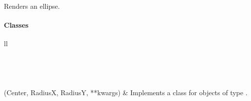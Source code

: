 \documentclass[letterpaper,10pt,english]{sphinxmanual}
\begin{document}
Renders an ellipse.


\paragraph{Classes}
\label{Chapters/PythonModuleReference/Patterns/TXLWizard.Patterns.Ellipse:classes}
\begin{longtable}{ll}
\hline
\endfirsthead

%
{{}} \\
\hline
\endhead

\hline {} \\ \hline
\endfoot

\endlastfoot


{\hyperref[Chapters/PythonModuleReference/Patterns/TXLWizard.Patterns.Ellipse:TXLWizard.Patterns.Ellipse.Ellipse]{}}(Center, RadiusX, RadiusY, **kwargs)
 & 
Implements a class for  objects of type .
\\
\hline\end{longtable}

\end{document}
